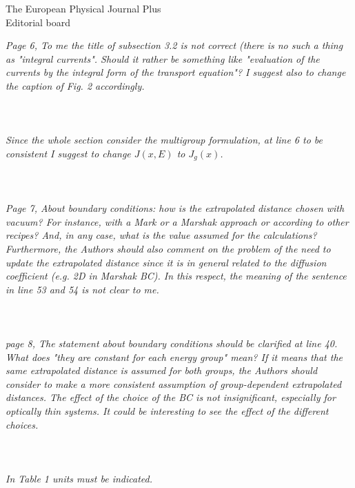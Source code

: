 \documentclass[11pt]{letter} %
\newcommand{\revised}[1]{{\color{red}{#1}}}
\begin{document}
\begin{letter}{The European Physical Journal Plus \\
Editorial board}
\newpage

\textit{Page 6, To me the title of subsection 3.2 is not correct (there is no such a thing as "integral currents". Should it rather be something like "evaluation of the currents by the integral form of the transport equation"? I suggest also to change the caption of Fig. 2 accordingly.}
\\ \\
\revised{T}
\\ \\
\textit{Since the whole section consider the multigroup formulation, at line 6 to be consistent I suggest to change $J(x,E)$ to $J_g(x)$. }
\\ \\
\revised{T}
\\ \\
\textit{Page 7, About boundary conditions: how is the extrapolated distance chosen with vacuum? For instance, with a Mark or a Marshak approach or according to other recipes? And, in any case, what is the value assumed for the calculations? Furthermore, the Authors should also comment on the problem of the need to update the extrapolated distance since it is in general related to the diffusion coefficient (e.g. 2D in Marshak BC). In this respect, the meaning of the sentence in line 53 and 54 is not clear to me.}
\\ \\
\revised{T}
\\ \\
\textit{page 8, The statement about boundary conditions should be clarified at line 40. What does "they are constant for each energy group" mean? If it means that the same extrapolated distance is assumed for both groups, the Authors should consider to make a more consistent assumption of group-dependent extrapolated distances. The effect of the choice of the BC is not insignificant, especially for optically thin systems. It could be interesting to see the effect of the different choices.}
\\ \\
\revised{T}
\\ \\
\textit{In Table 1 units must be indicated.}
\\ \\
\revised{T}
\\ \\


\end{letter}
\end{document}
